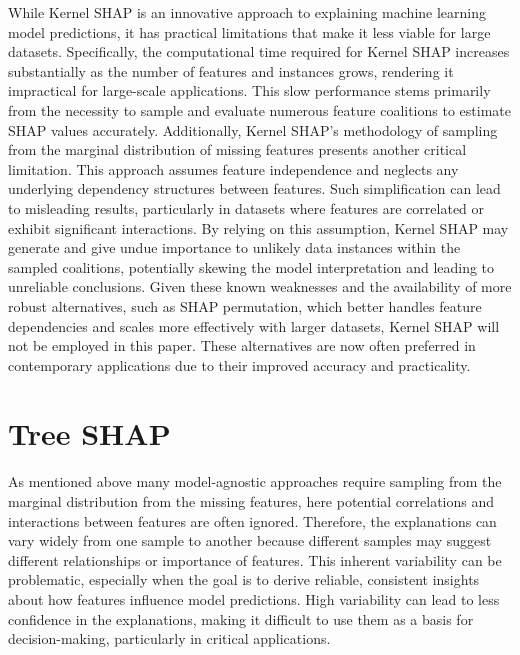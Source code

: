 \documentclass[12pt]{article}
\begin{document}
While Kernel SHAP is an innovative approach to explaining machine learning model predictions, it has practical limitations that make it less viable for large datasets. Specifically, the computational time required for Kernel SHAP increases substantially as the number of features and instances grows, rendering it impractical for large-scale applications. This slow performance stems primarily from the necessity to sample and evaluate numerous feature coalitions to estimate SHAP values accurately.
Additionally, Kernel SHAP's methodology of sampling from the marginal distribution of missing features presents another critical limitation. This approach assumes feature independence and neglects any underlying dependency structures between features. Such simplification can lead to misleading results, particularly in datasets where features are correlated or exhibit significant interactions. By relying on this assumption, Kernel SHAP may generate and give undue importance to unlikely data instances within the sampled coalitions, potentially skewing the model interpretation and leading to unreliable conclusions.
Given these known weaknesses and the availability of more robust alternatives, such as SHAP permutation, which better handles feature dependencies and scales more effectively with larger datasets, Kernel SHAP will not be employed in this paper. These alternatives are now often preferred in contemporary applications due to their improved accuracy and practicality.

\section{Tree SHAP}
As mentioned above many model-agnostic approaches require sampling from the marginal distribution from the missing features, here potential correlations and interactions between features are often ignored. Therefore, the explanations can vary widely from one sample to another because different samples may suggest different relationships or importance of features. This inherent variability can be problematic, especially when the goal is to derive reliable, consistent insights about how features influence model predictions. High variability can lead to less confidence in the explanations, making it difficult to use them as a basis for decision-making, particularly in critical applications.
\end{document}
